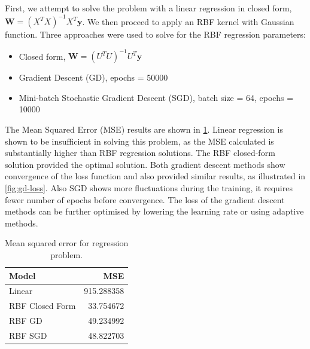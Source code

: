 \documentclass{article}
\begin{document}
First, we attempt to solve the problem with a linear regression in closed form, $\pmb{W} = (X^T X)^{-1} X^T \pmb{y}$. We then proceed to apply an RBF kernel with Gaussian function. Three approaches were used to solve for the RBF regression parameters:
\begin{itemize}
    \item Closed form, $\pmb{W} = (U^T U)^{-1} U^T \pmb{y}$
    \item Gradient Descent (GD), epochs = 50000
    \item Mini-batch Stochastic Gradient Descent (SGD), batch size = 64, epochs = 10000
\end{itemize}
The Mean Squared Error (MSE) results are shown in \cref{tab:mse-regression}. Linear regression is shown to be insufficient in solving this problem, as the MSE calculated is substantially higher than RBF regression solutions. The RBF closed-form solution provided the optimal solution. Both gradient descent methods show convergence of the loss function and also provided similar results, as illustrated in \cref{fig:gd-loss}. Also SGD shows more fluctuations during the training, it requires fewer number of epochs before convergence. The loss of the gradient descent methods can be further optimised by lowering the learning rate or using adaptive methods.

\begin{table}
    \centering
    \caption{Mean squared error for regression problem.}
    \label{tab:mse-regression}
    \begin{tabular}{lr}
    \toprule
    Model &         MSE \\
    \midrule
    Linear          &  915.288358 \\
    RBF Closed Form &   33.754672 \\
    RBF GD          &   49.234992 \\
    RBF SGD         &   48.822703 \\
    \bottomrule
    \end{tabular}
\end{table}
\end{document}
